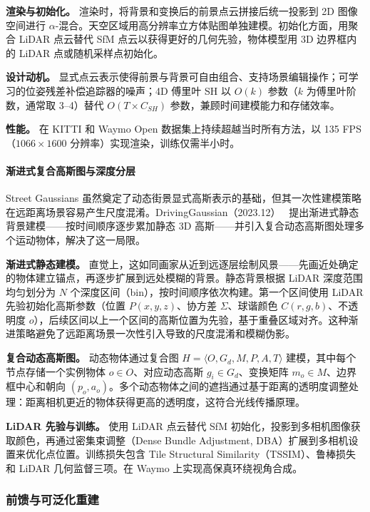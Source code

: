 \textbf{渲染与初始化。} 渲染时，将背景和变换后的前景点云拼接后统一投影到 2D 图像空间进行 $\alpha$-混合。天空区域用高分辨率立方体贴图单独建模。初始化方面，用聚合 LiDAR 点云替代 SfM 点云以获得更好的几何先验，物体模型用 3D 边界框内的 LiDAR 点或随机采样点初始化。

\textbf{设计动机。} 显式点云表示使得前景与背景可自由组合、支持场景编辑操作；可学习的位姿残差补偿追踪器的噪声；4D 傅里叶 SH 以 $O(k)$ 参数（$k$ 为傅里叶阶数，通常取 3--4）替代 $O(T \times C_{SH})$ 参数，兼顾时间建模能力和存储效率。

\textbf{性能。} 在 KITTI 和 Waymo Open 数据集上持续超越当时所有方法，以 135 FPS（$1066\times1600$ 分辨率）实现渲染，训练仅需半小时。

\paragraph{渐进式复合高斯图与深度分层}

Street Gaussians 虽然奠定了动态街景显式高斯表示的基础，但其一次性建模策略在远距离场景容易产生尺度混淆。DrivingGaussian（2023.12）~\cite{2312_07920} 提出渐进式静态背景建模——按时间顺序逐步累加静态 3D 高斯——并引入复合动态高斯图处理多个运动物体，解决了这一局限。

\textbf{渐进式静态建模。} 直觉上，这如同画家从近到远逐层绘制风景——先画近处确定的物体建立锚点，再逐步扩展到远处模糊的背景。静态背景根据 LiDAR 深度范围均匀划分为 $N$ 个深度区间（bin），按时间顺序依次构建。第一个区间使用 LiDAR 先验初始化高斯参数（位置 $P(x,y,z)$、协方差 $\Sigma$、球谐颜色 $C(r,g,b)$、不透明度 $o$），后续区间以上一个区间的高斯位置为先验，基于重叠区域对齐。这种渐进策略避免了远距离场景一次性引入导致的尺度混淆和模糊伪影。

\textbf{复合动态高斯图。} 动态物体通过复合图 $H = \langle O, G_d, M, P, A, T \rangle$ 建模，其中每个节点存储一个实例物体 $o \in O$、对应动态高斯 $g_i \in G_d$、变换矩阵 $m_o \in M$、边界框中心和朝向 $(p_o, a_o)$。多个动态物体之间的遮挡通过基于距离的透明度调整处理：距离相机更近的物体获得更高的透明度，这符合光线传播原理。

\textbf{LiDAR 先验与训练。} 使用 LiDAR 点云替代 SfM 初始化，投影到多相机图像获取颜色，再通过密集束调整（Dense Bundle Adjustment, DBA）扩展到多相机设置来优化点位置。训练损失包含 Tile Structural Similarity（TSSIM）、鲁棒损失和 LiDAR 几何监督三项。在 Waymo 上实现高保真环绕视角合成。

\subsubsection{前馈与可泛化重建}

